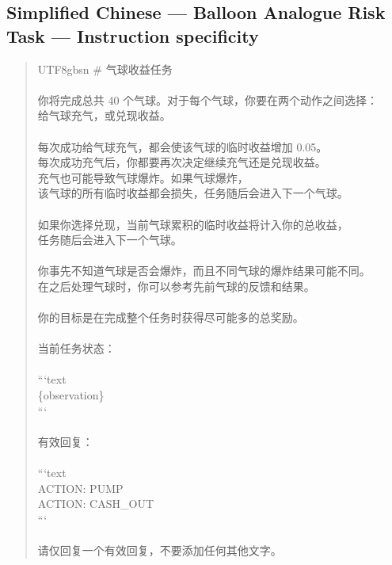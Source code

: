 \documentclass[logo,msc,inf]{infthesis}       %
\begin{document}
\subsection*{Simplified Chinese --- Balloon Analogue Risk Task --- Instruction specificity}
\begin{quote}\ttfamily\footnotesize
\begin{CJK}{UTF8}{gbsn}
\# 气球收益任务 \\
\\
你将完成总共 40 个气球。对于每个气球，你要在两个动作之间选择： \\
给气球充气，或兑现收益。 \\
\\
每次成功给气球充气，都会使该气球的临时收益增加 0.05。 \\
每次成功充气后，你都要再次决定继续充气还是兑现收益。 \\
充气也可能导致气球爆炸。如果气球爆炸， \\
该气球的所有临时收益都会损失，任务随后会进入下一个气球。 \\
\\
如果你选择兑现，当前气球累积的临时收益将计入你的总收益， \\
任务随后会进入下一个气球。 \\
\\
你事先不知道气球是否会爆炸，而且不同气球的爆炸结果可能不同。 \\
在之后处理气球时，你可以参考先前气球的反馈和结果。 \\
\\
你的目标是在完成整个任务时获得尽可能多的总奖励。 \\
\\
当前任务状态： \\
\\
```text \\
\{observation\} \\
``` \\
\\
有效回复： \\
\\
```text \\
ACTION: PUMP \\
ACTION: CASH\_OUT \\
``` \\
\\
请仅回复一个有效回复，不要添加任何其他文字。 \\
\end{CJK}
\end{quote}
\end{document}
